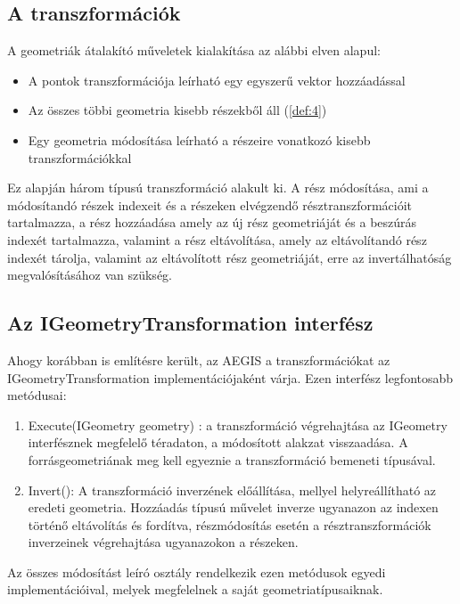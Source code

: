 \subsection{A transzformációk}
A geometriák átalakító műveletek kialakítása az alábbi elven alapul:
\begin{itemize}
	\item A pontok transzformációja leírható egy egyszerű vektor hozzáadással
	\item Az összes többi geometria kisebb részekből áll (\ref{def:4})
	\item Egy geometria módosítása leírható a részeire vonatkozó kisebb transzformációkkal
\end{itemize}
Ez alapján három típusú transzformáció alakult ki. A rész módosítása, ami a módosítandó részek indexeit és a részeken elvégzendő résztranszformációit tartalmazza, a rész hozzáadása amely az új rész geometriáját és a beszúrás indexét tartalmazza, valamint a rész eltávolítása, amely az eltávolítandó rész indexét tárolja, valamint az eltávolított rész geometriáját, erre az invertálhatóság megvalósításához van szükség.
\subsection{Az IGeometryTransformation interfész}
Ahogy korábban is említésre került, az AEGIS a transzformációkat az IGeometryTransformation implementációjaként várja. Ezen interfész legfontosabb metódusai:
\begin{enumerate}
	\item Execute(IGeometry geometry) : a transzformáció végrehajtása az IGeometry interfésznek megfelelő téradaton, a módosított alakzat visszaadása. A forrásgeometriának meg kell egyeznie a transzformáció bemeneti típusával.
	\item Invert(): A transzformáció inverzének előállítása, mellyel helyreállítható az eredeti geometria. Hozzáadás típusú művelet inverze ugyanazon az indexen történő eltávolítás és fordítva, részmódosítás esetén a résztranszformációk inverzeinek végrehajtása ugyanazokon a részeken.
\end{enumerate}
Az összes módosítást leíró osztály rendelkezik ezen metódusok egyedi implementációival, melyek megfelelnek a saját geometriatípusaiknak.
